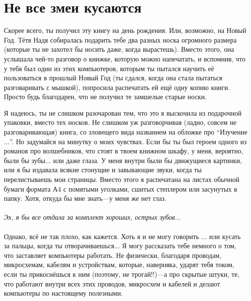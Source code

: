 

\chapter{Не все змеи кусаются}\label{ch:notallsnakeswillsquishyou}

Скорее всего, ты получил эту книгу на день рождения. Или, возможно, на Новый Год. Тётя Надя собиралась подарить тебе два разных носка огромного размера (которые ты не захотел бы носить даже, когда вырастешь). Вместо этого, она услышала чей-то разговор о книжке, которую можно напечатать, и вспомнив, что у тебя был один из этих компьютеров, которым ты пытался научить её пользоваться в прошлый Новый Год (ты сдался, когда она стала пытаться разговаривать с мышкой), попросила распечатать ей ещё одну копию книги. Просто будь благодарен, что не получил те замшелые старые носки.

Я надеюсь, ты не слишком разочарован тем, что это я выскочила из подарочной упаковки, вместо тех носков. Не слишком уж разговорчивая (ладно, совсем не разговаривающая) книга, со зловещего вида названием на обложке про ``Изучение $\ldots$''.
Но задумайся на минутку о моих чувствах. Если бы ты был героем одного из романов про волшебников, что стоят в твоем книжном шкафу, у меня, вероятно, были бы зубы... или даже глаза. У меня внутри были бы движущиеся картинки, или я бы издавала всякие стонущие и завывающие звуки, когда ты перелистываешь мои страницы. Вместо этого я распечатана на листах обычной бумаги формата А4 с помятыми уголками, сшитых степлером или засунутых в папку. Хотя, откуда бы мне знать---у меня же нет глаз.
\\
\\
\emph{Эх, я бы все отдала за комплект хороших, острых зубов$\ldots$}
\\
\\
Однако, всё не так плохо, как кажется. Хоть я и не могу говорить ... или кусать за пальцы, когда ты отворачиваешься... Я могу рассказать тебе немного о том, что заставляет компьютеры работать. Не физически, благодаря проводам, микросхемам, кабелям и устройствам, которые, наверняка, ударят тебя током, если ты прикоснёшься к ним (поэтому, не трогай!!)---а про скрытые штуки, те, что работают внутри всех этих проводов, микросхем и кабелей и делают компьютеры по настоящему полезными.

